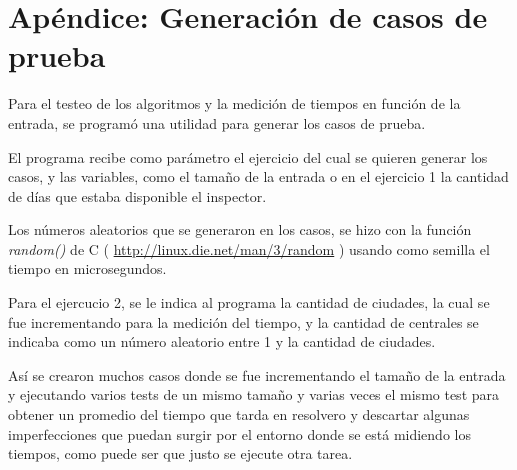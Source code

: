 \section{Ap\'endice: Generaci\'on de casos de prueba} \label{casos_de_prueba}

Para el testeo de los algoritmos y la medici\'on de tiempos en funci\'on de la entrada, se program\'o una utilidad para generar los casos de prueba.

El programa recibe como par\'ametro el ejercicio del cual se quieren generar los casos, y las variables, como el tama\~no de la entrada o en el ejercicio 1 la cantidad de d\'ias que estaba disponible el inspector.

Los n\'umeros aleatorios que se generaron en los casos, se hizo con la funci\'on \emph{random()} de C ( \href{http://linux.die.net/man/3/random}{http://linux.die.net/man/3/random} ) usando como semilla el tiempo en microsegundos.

Para el ejercucio 2, se le indica al programa la cantidad de ciudades, la cual se fue incrementando para la medici\'on del tiempo, y la cantidad de centrales se indicaba como un n\'umero aleatorio entre 1 y la cantidad de ciudades.

As\'i se crearon muchos casos donde se fue incrementando el tama\~no de la entrada y ejecutando varios tests de un mismo tama\~no y varias veces el mismo test para obtener un promedio del tiempo que tarda en resolvero y descartar algunas imperfecciones que puedan surgir por el entorno donde se est\'a midiendo los tiempos, como puede ser que justo se ejecute otra tarea.

